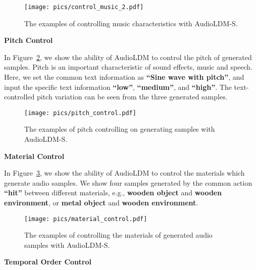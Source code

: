 \documentclass{article}
\begin{document}
\vspace{0.8cm}

\begin{figure}[H]
    \centering
    \texttt{[image: pics/control\_music\_2.pdf]}
    \caption{The examples of controlling music characteristics with AudioLDM-S.}
    \label{fig:demo-control-music}
\vspace{0.5cm}
\end{figure}

\newpage    

\textbf{Pitch Control}

In Figure~\ref{fig:pitch}, we show the ability of AudioLDM to control the pitch of generated samples. Pitch is an important characteristic of sound effects, music and speech. Here, we set the common text information as \textbf{``Sine wave with  pitch''}, and input the specific text information \textbf{``low''}, \textbf{``medium''}, and \textbf{``high''}. The text-controlled pitch variation can be seen from the three generated samples.

\vspace{0.5cm}


\begin{figure}[H]
    \centering
    \texttt{[image: pics/pitch\_control.pdf]}
    \caption{The examples of pitch controlling on generating samples with AudioLDM-S.}
    \label{fig:pitch}
\end{figure}


\newpage

\textbf{Material Control}

In Figure~\ref{fig:material}, we show the ability of AudioLDM to control the materials which generate audio samples. We show four samples generated by the common action \textbf{``hit''} between different materials, e.g., \textbf{wooden object} and \textbf{wooden environment}, or \textbf{metal object} and \textbf{wooden environment}. 

\vspace{0.5cm}

\begin{figure}[H]
    \centering
    \texttt{[image: pics/material\_control.pdf]}
    \caption{The examples of controlling the materials of generated audio samples with AudioLDM-S.}
    \label{fig:material}
\vspace{0.5cm}
\end{figure}

\vspace{0.5cm}
\textbf{Temporal Order Control}
\end{document}
